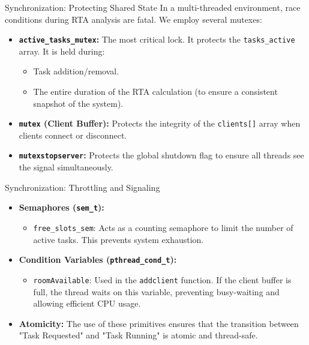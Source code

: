 \begin{frame}{Synchronization: Protecting Shared State}
    In a multi-threaded environment, race conditions during RTA analysis are fatal. We employ several mutexes:
    \begin{itemize}
        \item \textbf{\texttt{active\_tasks\_mutex}:} The most critical lock. It protects the \texttt{tasks\_active} array. It is held during:
        \begin{itemize}
            \item Task addition/removal.
            \item The entire duration of the RTA calculation (to ensure a consistent snapshot of the system).
        \end{itemize}
        \item \textbf{\texttt{mutex} (Client Buffer):} Protects the integrity of the \texttt{clients[]} array when clients connect or disconnect.
        \item \textbf{\texttt{mutexstopserver}:} Protects the global shutdown flag to ensure all threads see the signal simultaneously.
    \end{itemize}
\end{frame}


\begin{frame}{Synchronization: Throttling and Signaling}
    \begin{itemize}
        \item \textbf{Semaphores (\texttt{sem\_t}):}
        \begin{itemize}
            \item \texttt{free\_slots\_sem}: Acts as a counting semaphore to limit the number of active tasks. This prevents system exhaustion.
        \end{itemize}
        \item \textbf{Condition Variables (\texttt{pthread\_cond\_t}):}
        \begin{itemize}
            \item \texttt{roomAvailable}: Used in the \texttt{addclient} function. If the client buffer is full, the thread waits on this variable, preventing busy-waiting and allowing efficient CPU usage.
        \end{itemize}
        \item \textbf{Atomicity:} The use of these primitives ensures that the transition between "Task Requested" and "Task Running" is atomic and thread-safe.
    \end{itemize}
\end{frame}

